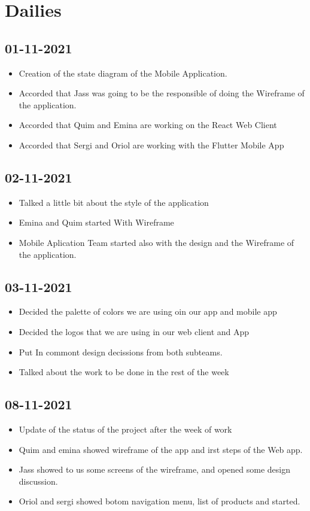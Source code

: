 \documentclass[./main.tex]{subfiles}
\begin{document}
\section{Dailies}

\subsection{01-11-2021}
\begin{itemize}
\item Creation of the state diagram of the Mobile Application.
\item Accorded that Jass was going to be the responsible of doing the Wireframe of the application.
\item Accorded that Quim and Emina are working on the React Web Client
\item Accorded that Sergi and Oriol are working with the Flutter Mobile App
\end{itemize}

\subsection{02-11-2021}
\begin{itemize}
\item Talked a little bit about the style of the application
\item Emina and Quim started With Wireframe
\item Mobile Aplication Team started also with the design and the Wireframe of the application.
\end{itemize}

\subsection{03-11-2021}
\begin{itemize}
\item Decided the palette of colors we are using oin our app and mobile app
\item Decided the logos that we are using in our web client and App
\item Put In commont design decissions from both subteams.
\item Talked about the work to be done in the rest of the week
\end{itemize}


\subsection{08-11-2021}
\begin{itemize}
\item Update of the status of the project after the week of work
\item Quim and emina showed wireframe of the app and irst steps of the Web app.
\item Jass showed to us some screens of the wireframe, and opened some design discussion.
\item Oriol and sergi showed botom navigation menu, list of products and started.
\end{itemize}
\end{document}
